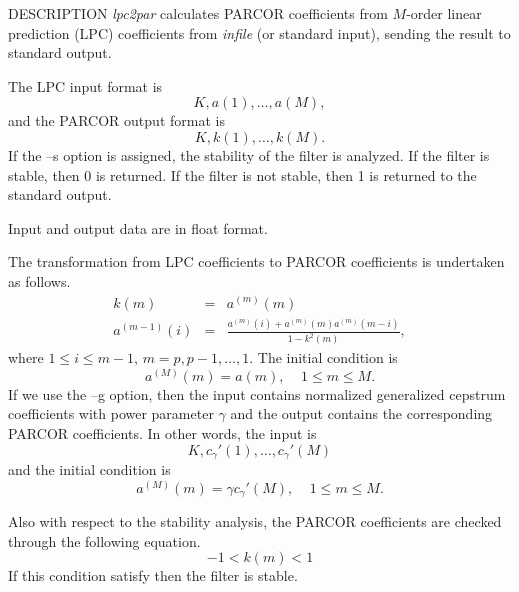 \begin{qsection}{DESCRIPTION}
{\em lpc2par} calculates PARCOR coefficients 
from $M$-order linear prediction (LPC) coefficients 
from {\em infile} (or standard input), 
sending the result to standard output.

The LPC input format is
\begin{displaymath}
  K, a(1),\ldots, a(M), 
\end{displaymath}
and the PARCOR output format is
\begin{displaymath}
  K, k(1),\ldots, k(M).
\end{displaymath}
If the --s option is assigned, the stability of the filter is analyzed.
If the filter is stable, then 0 is returned.
If the filter is not stable, then 1 is returned to the standard output.
\par
Input and output data are in float format.
\par
The transformation from LPC coefficients to PARCOR coefficients
is undertaken as follows.
\begin{eqnarray*} 
k(m) &=& a^{(m)}(m) \\
a^{(m-1)}(i) &=& \frac{a^{(m)}(i)+a^{(m)}(m)a^{(m)}(m-i)}{1-k^2(m)},
\end{eqnarray*}
where $1 \leq i \leq m-1$, $m=p, p-1, \ldots, 1$.
The initial condition is
\begin{displaymath}
a^{(M)}(m) = a(m), ~~~~~1 \leq m \leq M.
\end{displaymath}
If we use the --g option, then the input contains normalized generalized
cepstrum coefficients with power parameter $\gamma$
and the output contains the corresponding PARCOR coefficients.
In other words, the input is 
\begin{displaymath}
K,c_\gamma'(1),\ldots,c_\gamma'(M)
\end{displaymath}
and the initial condition is
\begin{displaymath}
a^{(M)}(m) = \gamma c_\gamma'(M), ~~~~~1 \leq m \leq M.
\end{displaymath}

Also with respect to the stability analysis,
the PARCOR coefficients are checked through the following equation.
\begin{displaymath}
-1 < k(m) < 1
\end{displaymath}
If this condition satisfy then the filter is stable.

\end{qsection}

\begin{options}
\end{options}

